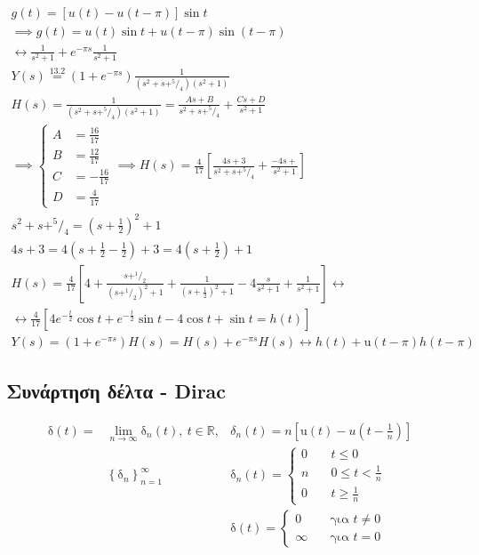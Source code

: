 \documentclass[11pt,a4paper,titlepage,final]{article}
\begin{document}
\begin{exercise*}{13.3}
\begin{centering}
	\end{centering}
	\begin{gather*}
	g(t) = \left[u(t)-u(t-\pi)\right]\sin t \\
	\implies g(t) = u(t)\sin t +u(t-\pi)\sin(t-\pi)\\
	\leftrightarrow \frac{1}{s^2+1}+e^{-\pi s}\frac{1}{s^2+1}
	\\
	Y(s) \overset{\text{13.2}}{=}\left(1+e^{-\pi s}\right)\frac{1}{(s^2+s+^5/_4)\left(s^2+1\right)}
	\\
	H(s) = \frac{1}{(s^2+s+^5/_4)\left(s^2+1\right)} = \frac{As+B}{s^2+s+^5/_4} + \frac{Cs+D}{s^2+1}
	\\
	\implies \begin{cases}
	A &= \frac{16}{17} \\
	B &= \frac{12}{17} \\
	C &= - \frac{16}{17} \\
	D &= \frac{4}{17}
	\end{cases} \implies H(s) = \frac{4}{17} \left[
	\frac{4s+3}{s^2+s+^5/_4}+ \frac{-4s+}{s^2+1}
	\right]
	\\
	s^2+s+^5/_4 = \left(s+\frac{1}{2}\right)^2 + 1 \\
	4s+3 = 4\left(s+\frac{1}{2}-\frac{1}{2}\right)+3 = 4\left(s+\frac{1}{2}\right)+1
	\\
	H(s) = \frac{4}{17} \left[
	4+\frac{s+^1/_2}{\left(s+^1/_2\right)^2+1}+\frac{1}{\left(s+\frac{1}{2}\right)^2+1}-4\frac{s}{s^2+1}+\frac{1}{s^2+1}
	\right] \leftrightarrow \\
	\leftrightarrow \frac{4}{17} \left[
	4e^{-\frac{t}{2}}\cos t + e^{-\frac{t}{2}}\sin t - 4\cos t +\sin t =h(t)
	\right] \\
	Y(s) =
	\left(1+e^{-\pi s}\right)H(s) = H(s) + e^{-\pi s}H(s) \leftrightarrow h(t) + \mathrm u(t-\pi)h(t-\pi)
	\end{gather*}
\end{exercise*}

\subsection{Συνάρτηση δέλτα - \textlatin{Dirac}}
\begin{align*}
\mathrm{\delta}(t) =& \lim_{n\to \infty}\mathrm \delta_n(t),\ t \in \mathbb R, & \delta_n(t) = n \left[
\mathrm u(t) - u\left(t-\frac{1}{n}\right)
\right] \\
&
\left\lbrace \mathrm \delta_n \right\rbrace_{n=1}^\infty
& \mathrm{\delta}_n(t) = \begin{cases}
0 \quad& t\leq0 \\ n \quad& 0 \leq t < \frac{1}{n} \\ 0 \quad& t \geq \frac{1}{n}
\end{cases} \\ & & \mathrm \delta(t) = \begin{cases}
0 \quad& \text{για } t \neq 0\\
\infty \quad& \text{για } t = 0
\end{cases}
\end{align*}
\end{document}

